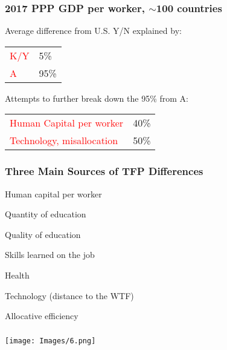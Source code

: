 \documentclass[serif,professionalfont,red,aspectratio=169]{beamer}
\begin{document}
\begin{frame}[t]
\frametitle{2017 PPP GDP per worker, $\sim$100 countries
}
\vspace{4mm}
Average difference from U.S. Y/N explained by:
\begin{table}
\centering
\renewcommand*\arraystretch{1.3}
    \begin{tabular}{l l}
    \textcolor{red}{K/Y}&5\%\\ 
    \textcolor{red}{A}&95\%\\
    \end{tabular}
\end{table}
\vspace{4mm}
Attempts to further break down the 95\% from A:
\begin{table}
\centering
\renewcommand*\arraystretch{1.3}
    \begin{tabular}{l l}
    \textcolor{red}{Human Capital per worker}&40\%\\
\textcolor{red}{Technology, misallocation}&50\%\\
    \end{tabular}
\end{table}
\end{frame}
\begin{frame}[t]
\frametitle{Three Main Sources of TFP Differences}
\vspace{4mm}
Human capital per worker 

\vspace{2mm}
\hspace{8mm}Quantity of education
\vspace{2mm}

\hspace{8mm}Quality of education 
\vspace{2mm}

\hspace{8mm}Skills learned on the job 

\vspace{2mm}
\hspace{8mm}Health

\vspace{8mm}

Technology (distance to the WTF)

\vspace{8mm}

Allocative efficiency
\end{frame}
\begin{frame}[t]
\frametitle{}
\begin{center}
\texttt{[image: Images/6.png]}
\end{center}
\end{frame}
\end{document}
